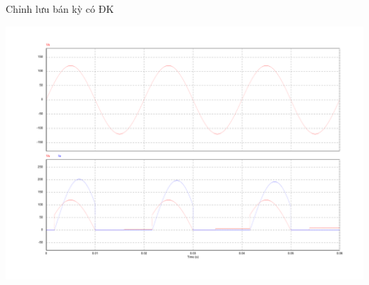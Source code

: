 \documentclass[24pt]{beamer}
\begin{document}
\begin{frame}{Chỉnh lưu bán kỳ có ĐK}
	\begin{center}
		\vspace{-.7cm}
		\includegraphics[scale=.35]{images-chude6/chinh-luu-1pha-co-dieu-khien-them-diode-zero-tai-motor-DC-plot-Vs-Vu-Iu-alpha-30.pdf} 
	\end{center}
\end{frame}
\end{document}
